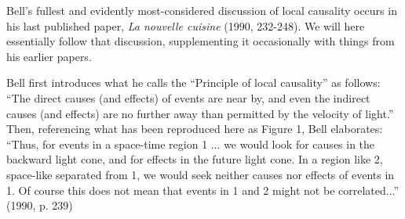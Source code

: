 \documentclass[aps,prc,twocolumn]{revtex4}
\begin{document}
Bell's fullest and evidently most-considered discussion of local
causality occurs in his last published paper, \emph{La nouvelle
cuisine} (1990, 232-248).  We will here essentially follow that discussion,
supplementing it occasionally with things from his earlier papers.

Bell first introduces what he calls the ``Principle of local
causality'' as follows:  
``The direct causes (and effects) of events are near by, and even the
indirect causes (and effects) are no further away than permitted by
the velocity of light.''
Then, referencing what has been reproduced here as Figure 1, Bell
elaborates:  ``Thus, for events in a space-time region 1 ... we would
look for causes in the backward light cone, and for effects in the
future light cone.  In a region like 2, space-like separated from 1,
we would seek neither causes nor effects of events in 1.  Of course
this does not mean that events in 1 and 2 might not be correlated...''  
(1990, p. 239)
\end{document}
